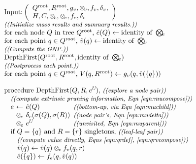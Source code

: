 \documentclass[twoside,leqno,twocolumn]{article}
\newcommand{\com}[1]{{\small \textit{((#1))}}}
\newcommand{\summary}{\delta}
\newcommand{\psty}{}
\newcommand{\X}{\\ \psty}
\newcommand{\x}{\X \hspace{0.13in}}
\newcommand{\xx}{\X \hspace{0.26in}}
\newcommand{\kdroot}[1]{#1^{\text{root}}}
\newcommand{\nameOp}[2]{\mathop{#1\nolimits\!\!_{#2}}}
\newcommand{\nameop}[2]{#1_{\!#2}}
\newcommand{\myOp}[1]{\nameOp{\bigotimes}{#1}}
\newcommand{\myop}[1]{\nameop{\otimes}{#1}}
\newcommand{\letterqr}{v}
\newcommand{\outqr}{V}
\newcommand{\Opqr}{\myOp{\letterqr}}
\newcommand{\opqr}{\myop{\letterqr}}
\newcommand{\fqr}{f_{\letterqr}}
\newcommand{\gqr}{g_{\letterqr}}
\newcommand{\letterqrv}{v}
\newcommand{\deltaqrv}{\summary_{\letterqrv}}
\newcommand{\varqr}{\hat{\letterqr}}
\newcommand{\lettermu}{e}
\newcommand{\inmu}{e}
\newcommand{\outopmu}{\myop{\lettermu}}
\newcommand{\Opmu}{\myOp{\lettermu}}
\newcommand{\opmu}{\myop{\lettermu}}
\newcommand{\fmu}{f_{\lettermu}}
\newcommand{\fmuv}{f_{\lettermu}}
\newcommand{\deltamu}{\summary_{\lettermu}}
\newcommand{\canprunemu}{C}
\newcommand{\heurqr}{H}
\newcommand{\varmuchild}{\hat{\lettermu}}
\newcommand{\varmuparent}{\lettermu^{U\!}}
\newcommand{\outstat}{\sigma}
\begin{document}
\begin{figure}
  \vspace{-0.3in}
\[
  \begin{array}[t]{l}
    \\ \text{Input:}\left(
        \begin{array}[c]{l}\kdroot{Q}, \kdroot{R}, \gqr, \opqr, \fqr, \deltaqrv, \\ \heurqr, \canprunemu, \outopmu, \opmu, \fmuv, \deltamu\end{array}\right)
    \X \text{\com{Initialize mass results and summary results.}}
    \X \text{for each node } Q \text{ in tree } \kdroot{Q}\text{, } \varmuchild(Q) \gets \text{identity of }\Opmu
    \X \text{for each point } q \in \kdroot{Q}\text{, } \varqr(q) \gets \text{identity of }\Opqr
    \X \text{\com{Compute the GNP.}}
    \X \text{DepthFirst}(\kdroot{Q}, \kdroot{R}, \text{identity of }\Opmu)
    \X \text{\com{Postprocess each point.}}
    \X \text{for each point } q \in \kdroot{Q}\text{, } \outqr(q, \kdroot{R}) \gets \gqr(q, \varqr(\{q\}))
    \X
    \X \text{procedure DepthFirst}(Q, R, \varmuparent)\text{, \com{explore a node pair}}
    \x \text{\com{compute extrinsic pruning information, Eqn~\ref{eqn:mucompose}}}
    \x \!\!\!\begin{array}{llll}
         \psty\lettermu &\psty\!\!\!\!\gets\!\!\!\!& \psty\varmuchild(Q)                     & \!\!\!\text{\com{bottom-up, via Eqn~\ref{eqn:muchild}}}
         \\             &\psty\!\!\!\!\opmu\!\!\!\!& \psty\deltamu(\outstat(Q), \outstat(R)) & \!\!\!\text{\com{node pair's, Eqn~\ref{eqn:mudelta}}}
         \\             &\psty\!\!\!\!\opmu\!\!\!\!& \psty\varmuparent                       & \!\!\!\text{\com{unvisited, Eqn~\ref{eqn:muparent}}}
       \end{array}
    \x \text{if } Q = \{q\}\text{ and }R = \{r\}\text{ singletons, \com{leaf-leaf pair}}
    \xx \text{\com{compute value directly, Eqns \ref{eqn:qrdef}, \ref{eqn:qrvcompose}}}
    \xx \varqr(q) \gets \varqr(q) \opqr \fqr(q, r)
    \xx \varmuchild(\{q\}) \gets \fmu(q, \varqr(q))

\end{array}\]
\end{figure}
\end{document}
